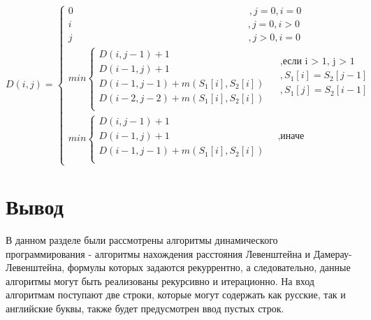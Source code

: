 \begin{equation}
	\label{eq:DL}
	D(i, j) = \begin{cases}
		0  \qquad\qquad\qquad\qquad\qquad\qquad\qquad\qquad\qquad,j = 0, i = 0\\
		i  \qquad\qquad\qquad\qquad\qquad\qquad\qquad\qquad\qquad,j = 0, i > 0\\
		j  \qquad\qquad\qquad\qquad\qquad\qquad\qquad\qquad\qquad,j > 0, i = 0\\
		min \begin{cases}
			D(i, j - 1) + 1\\
			D(i - 1, j) + 1\\
			D(i - 1, j - 1) + m(S_{1}[i], S_{2}[i]) \\
			D(i - 2, j - 2) + m(S_{1}[i], S_{2}[i]) \\
		\end{cases}
		\begin{aligned}
			& , \text{если i > 1, j > 1} \\
			& , S_{1}[i] = S_{2}[j - 1]  \\
			& , S_{1}[j] =  S_{2}[i - 1] \\
		\end{aligned}\\
		min \begin{cases}
			D(i, j - 1) + 1\\
			D(i - 1, j) + 1 & \;\; \text{,иначе}\\
			D(i - 1, j - 1) + m(S_{1}[i], S_{2}[i]) \\
		\end{cases}
	\end{cases}
\end{equation}

\section{Вывод}

В данном разделе были рассмотрены алгоритмы динамического программирования - алгоритмы нахождения расстояния Левенштейна и Дамерау-Левенштейна, формулы которых задаются рекуррентно, а следовательно, данные алгоритмы могут быть реализованы рекурсивно и итерационно. На вход алгоритмам поступают две строки, которые могут содержать как русские, так и английские буквы, также будет предусмотрен ввод пустых строк.
